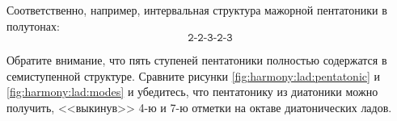 Соответственно, например, интервальная структура мажорной пентатоники в полутонах:
\[
    \texttt{2-2-3-2-3}
\]

Обратите внимание, что пять ступеней пентатоники полностью содержатся в семиступенной структуре. Сравните рисунки \ref{fig:harmony:lad:pentatonic} и \ref{fig:harmony:lad:modes} и убедитесь, что пентатонику из диатоники можно получить, <<выкинув>> 4-ю и 7-ю отметки на октаве диатонических ладов.


